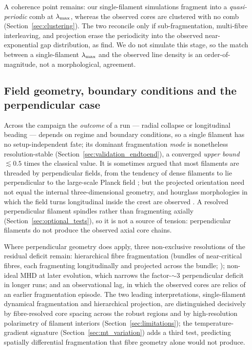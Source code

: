 \documentclass[usenatbib,twoside,twocolumn]{mnras}
\begin{document}
A coherence point remains: our single-filament simulations fragment into a \emph{quasi-periodic} comb at $\lambda_{\rm max}$, whereas the observed cores are clustered with no comb (Section~\ref{sec:clustering}). The two reconcile only if sub-fragmentation, multi-fibre interleaving, and projection erase the periodicity into the observed near-exponential gap distribution, as \citet{Clarke2020} find. We do not simulate this stage, so the match between a single-filament $\lambda_{\rm max}$ and the observed line density is an order-of-magnitude, not a morphological, agreement.



\subsection{Field geometry, boundary conditions and the perpendicular case}
\label{sec:why_mhd_fails}

Across the campaign the \emph{outcome} of a run --- radial collapse or longitudinal beading --- depends on regime and boundary conditions, so a single filament has no setup-independent fate; its dominant fragmentation \emph{mode} is nonetheless resolution-stable (Section~\ref{sec:validation_endtoend}), a converged \emph{upper bound} $\lesssim0.5$ times the classical value. It is sometimes argued that most filaments are threaded by perpendicular fields, from the tendency of dense filaments to lie perpendicular to the large-scale Planck field \citep{Planck2016}; but the projected orientation need not equal the internal three-dimensional geometry, and hourglass morphologies in which the field turns longitudinal inside the crest are observed \citep{Jadhav2026}. A resolved perpendicular filament spindles rather than fragmenting axially (Section~\ref{sec:optional_tests}), so it is not a source of tension: perpendicular filaments do not produce the observed axial core chains.

Where perpendicular geometry does apply, three non-exclusive resolutions of the residual deficit remain: hierarchical fibre fragmentation (bundles of near-critical fibres, each fragmenting longitudinally and projected across the bundle; \citealt{Hacar2013,Hacar2018,Yang2024}); non-ideal MHD at later evolution, which narrows the factor-$\sim3$ perpendicular deficit in longer runs; and an observational lag, in which the observed cores are relics of an earlier fragmentation episode. The two leading interpretations, single-filament dynamical fragmentation and hierarchical projection, are distinguished decisively by fibre-resolved core spacing across the robust regions and by high-resolution polarimetry of filament interiors (Section~\ref{sec:limitations}); the temperature-gradient signature (Section~\ref{sec:mt_variation}) adds a third test, predicting spatially differential fragmentation that fibre geometry alone would not produce.
\end{document}
